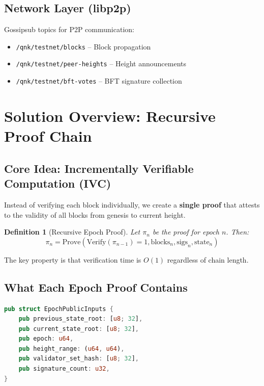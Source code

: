 \documentclass[11pt,a4paper]{article}
\newtheorem{definition}[theorem]{Definition}
\begin{document}
\subsection{Network Layer (libp2p)}

Gossipsub topics for P2P communication:
\begin{itemize}
    \item \texttt{/qnk/testnet/blocks} -- Block propagation
    \item \texttt{/qnk/testnet/peer-heights} -- Height announcements
    \item \texttt{/qnk/testnet/bft-votes} -- BFT signature collection
\end{itemize}

\section{Solution Overview: Recursive Proof Chain}

\subsection{Core Idea: Incrementally Verifiable Computation (IVC)}

Instead of verifying each block individually, we create a \textbf{single proof} that attests to the validity of all blocks from genesis to current height.

\begin{definition}[Recursive Epoch Proof]
Let $\pi_n$ be the proof for epoch $n$. Then:
$$\pi_n = \text{Prove}\left(\text{Verify}(\pi_{n-1}) = 1, \text{blocks}_n, \text{sigs}_n, \text{state}_n\right)$$
\end{definition}

The key property is that verification time is $O(1)$ regardless of chain length.

\subsection{What Each Epoch Proof Contains}

\begin{lstlisting}[language=Rust,caption=Epoch proof public inputs]
pub struct EpochPublicInputs {
    pub previous_state_root: [u8; 32],
    pub current_state_root: [u8; 32],
    pub epoch: u64,
    pub height_range: (u64, u64),
    pub validator_set_hash: [u8; 32],
    pub signature_count: u32,
}
\end{lstlisting}
\end{document}
